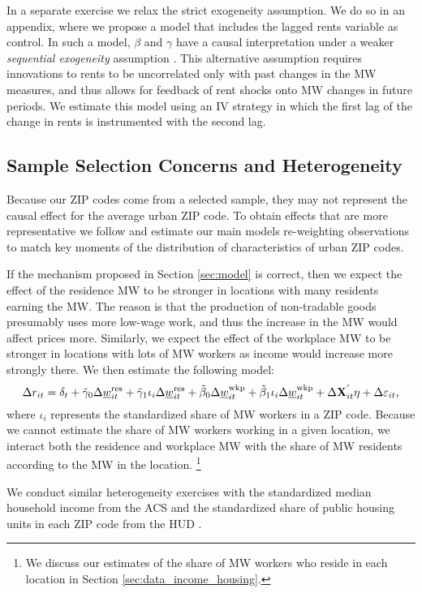 In a separate exercise we relax the strict exogeneity assumption.
We do so in an appendix, where we propose a model that includes the lagged 
rents variable as control.
In such a model, $\beta$ and $\gamma$ have a causal interpretation under a 
weaker \textit{sequential exogeneity} assumption
\parencite{ArellanoBond1991, ArellanoHonore2001}.
This alternative assumption requires innovations to rents to be uncorrelated 
only with past changes in the MW measures, and thus allows for feedback of 
rent shocks onto MW changes in future periods.
We estimate this model using an IV strategy in which the first lag of the change
in rents is instrumented with the second lag.


\subsection{Sample Selection Concerns and Heterogeneity}\label{sec:emp_start_heterogeneity}

Because our ZIP codes come from a selected sample, they may not represent
the causal effect for the average urban ZIP code.
To obtain effects that are more representative we follow 
\textcite{Hainmueller2012} and estimate our main models re-weighting 
observations to match key moments of the distribution of characteristics of 
urban ZIP codes.

If the mechanism proposed in Section \ref{sec:model} is correct, then we
expect the effect of the residence MW to be stronger in locations with many 
residents earning the MW.
The reason is that the production of non-tradable goods presumably uses more
low-wage work, and thus the increase in the MW would affect prices more.
Similarly, we expect the effect of the workplace MW to be stronger in locations
with lots of MW workers as income would increase more strongly there.
We then estimate the following model:
\begin{equation}\label{eq:fd_heterogeneity}
    \Delta r_{it} = \delta_t
                  + \tilde\gamma_0 \Delta \underline{w}^{\text{res}}_{it}
                  + \tilde\gamma_1 \iota_i \Delta \underline{w}^{\text{res}}_{it}
                  + \tilde\beta_0 \Delta \underline{w}^{\text{wkp}}_{it}
                  + \tilde\beta_1 \iota_i \Delta \underline{w}^{\text{wkp}}_{it}
                  + \Delta \mathbf{X}^{'}_{it}\eta
                  + \Delta \varepsilon_{it} ,
\end{equation}
where $\iota_i$ represents the standardized share of MW workers in a ZIP code.
Because we cannot estimate the share of MW workers working in a given location,
we interact both the residence and workplace MW with the share of MW residents
according to the MW in the location.%
\footnote{We discuss our estimates of the share of MW workers who reside in each 
location in Section \ref{sec:data_income_housing}.}

We conduct similar heterogeneity exercises with the standardized median household 
income from the ACS \parencite{CensusACS} and the standardized share of public 
housing units in each ZIP code from the HUD \parencite{hudHousing}.
